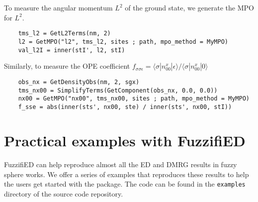 \documentclass{timesjhep}
\begin{document}
To measure the angular momentum $L^2$ of the ground state, we generate the MPO for $L^2$.
\begin{lstlisting}
    tms_l2 = GetL2Terms(nm, 2)
    l2 = GetMPO("l2", tms_l2, sites ; path, mpo_method = MyMPO)
    val_l2I = inner(stI', l2, stI)
\end{lstlisting}
Similarly, to measure the OPE coefficient $f_{\sigma\sigma\epsilon}=\langle \sigma|n^x_{00}|\epsilon\rangle/\langle \sigma|n^x_{00}|0\rangle$
\begin{lstlisting}
    obs_nx = GetDensityObs(nm, 2, sgx)
    tms_nx00 = SimplifyTerms(GetComponent(obs_nx, 0.0, 0.0))
    nx00 = GetMPO("nx00", tms_nx00, sites ; path, mpo_method = MyMPO)
    f_sse = abs(inner(sts', nx00, ste) / inner(sts', nx00, stI))
\end{lstlisting}

\section{Practical examples with FuzzifiED}
\label{sec:examples}

FuzzifiED can help reproduce almost all the ED and DMRG results in fuzzy sphere works. We offer a series of examples that reproduces these results to help the users get started with the package. The code can be found in the \lstinline|examples| directory of the source code repository. 

\newcommand{\linkexample}[1]{\href{https://github.com/FuzzifiED/FuzzifiED.jl/blob/main/examples/#1}{\lstinline|#1|}}
\end{document}
